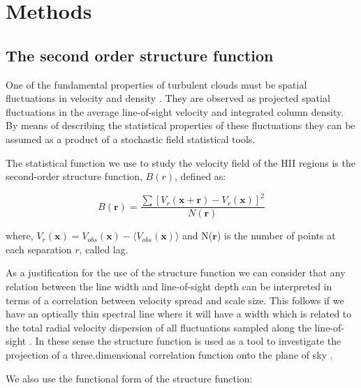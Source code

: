 \documentclass[fleqn,usenatbib, useAMS, a4paper]{mnras}
\begin{document}

\section{Methods}\label{sec:met}

\subsection{The second order structure function}

One of the fundamental properties of turbulent clouds must be spatial fluctuations in velocity and density \citep{1984ApJ...277..556S}.
They are observed as projected spatial fluctuations in the average line-of-sight velocity and integrated column density.
By means of describing the statistical properties of these fluctuations they can be assumed as a product of a stochastic field statistical tools.

The statistical function we use to study the velocity field of the HII regions is the second-order structure function, $B(r)$, defined as:

\begin{equation}\label{eq:S}
B(\boldsymbol{r})=\dfrac{\sum[V_{r}(\boldsymbol{x}+\boldsymbol{r})-V_{r}(\boldsymbol{x}) ]^{2}}{N(\boldsymbol{r})}
\end{equation}

where, $V_{r}(\boldsymbol{x})= V_{obs}(\boldsymbol{x})-\langle V_{obs}(\boldsymbol{x}) \rangle$ and N($\boldsymbol{r}$) is the number of points at each separation \(r\), called lag.

As a justification for the use of the structure function we can consider that any relation between the line width and line-of-sight depth can be interpreted in terms of a correlation between velocity spread and scale size.
This follows if we have an optically thin spectral line where it will have a width which is related to the total radial velocity dispersion of all fluctuations sampled along the line-of-sight \citep{1984ApJ...277..556S}. 
In these sense the structure function is used as a tool to investigate the projection of a three.dimensional correlation function onto the plane of sky \citep{arthur2016turbulence}.

We also use the functional form of the structure function:
\end{document}
